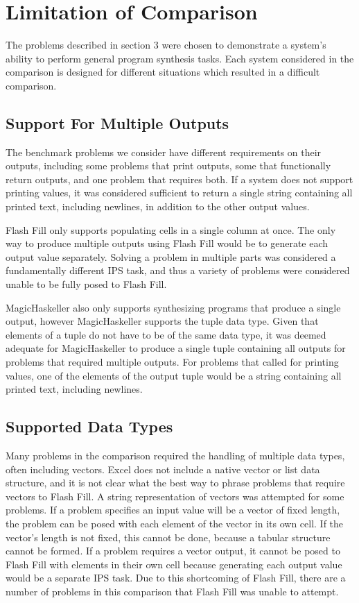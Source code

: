 \section{Limitation of Comparison}

The problems described in section 3 were chosen to demonstrate a system's ability to perform general program synthesis tasks. Each system considered in the comparison is designed for different situations which resulted in a difficult comparison.

\subsection{Support For Multiple Outputs}

The benchmark problems we consider have different requirements on their outputs, including some problems that print outputs, some that functionally return outputs, and one problem that requires both. If a system does not support printing values, it was considered sufficient to return a single string containing all printed text, including newlines, in addition to the other output values.

Flash Fill only supports populating cells in a single column at once. The only way to produce multiple outputs using Flash Fill would be to generate each output value separately. Solving a problem in multiple parts was considered a fundamentally different IPS task, and thus a variety of problems were considered unable to be fully posed to Flash Fill.

MagicHaskeller also only supports synthesizing programs that produce a single output, however MagicHaskeller supports the tuple data type. Given that elements of a tuple do not have to be of the same data type, it was deemed adequate for MagicHaskeller to produce a single tuple containing all outputs for problems that required multiple outputs. For problems that called for printing values, one of the elements of the output tuple would be a string containing all printed text, including newlines.

\subsection{Supported Data Types}

Many problems in the comparison required the handling of multiple data types, often including vectors.  Excel does not include a native vector or list data structure, and it is not clear what the best way to phrase problems that require vectors to Flash Fill. A string representation of vectors was attempted for some problems. If a problem specifies an input value will be a vector of fixed length, the problem can be posed with each element of the vector in its own cell. If the vector's length is not fixed, this cannot be done, because a tabular structure cannot be formed. If a problem requires a vector output, it cannot be posed to Flash Fill with elements in their own cell because generating each output value would be a separate IPS task. Due to this shortcoming of Flash Fill, there are a number of problems in this comparison that Flash Fill was unable to attempt.

